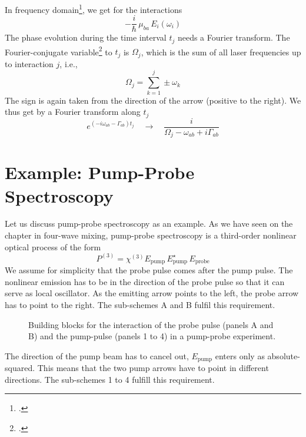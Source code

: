 In frequency domain\footcite{Boyd2008,Shen2003}, we get for the interactions
\begin{equation}
 - \frac{i}{\hbar} \, \mu_{ba} \, E_i(\omega_i)  
\end{equation}
The phase evolution during the time interval $t_j$ needs a Fourier transform. 
The Fourier-conjugate variable\footcite{Tokmakoff09} to $t_j$  is $\Omega_j$, which is the sum of all laser frequencies up to interaction $j$, i.e.,
\begin{equation}
 \Omega_j = \sum_{k=1}^j \pm \omega_k
\end{equation}
The sign is again taken from the direction of the arrow (positive to the right). We thus get
 by a Fourier transform  along $t_j$ 
\begin{equation}
 e^{ (-i \omega_{ab} - \Gamma_{ab}) t_j }  \quad \rightarrow \quad
 \frac{i }{\Omega_j - \omega_{ab}  + i \Gamma_{ab} } 
\end{equation}




\section{Example: Pump-Probe Spectroscopy}

Let us discuss pump-probe spectroscopy as an example. As we have seen on the chapter in four-wave mixing, pump-probe spectroscopy is a third-order nonlinear optical process of the form
\begin{equation}
 P^{(3)} =  \chi^{(3)} E_\text{pump} \, E_\text{pump}^\star \, E_\text{probe}
\end{equation}
We assume for simplicity that the probe pulse comes after the pump pulse. The nonlinear emission has to be in the direction of the probe pulse so that it can serve as local oscillator. As the emitting arrow points to the left, the probe arrow has to point to the right. The sub-schemes A and B fulfil this requirement.


\begin{figure}

\caption{
Building blocks for the interaction of the probe pulse (panels A and B) and the pump-pulse (panels 1 to 4) in a pump-probe experiment.}
\label{fig:2d_feynman_pp_elements}
\end{figure}

The direction of the pump beam has to cancel out, $E_\text{pump} $ enters only as absolute-squared. This means that the two pump arrows have to point in different directions. The sub-schemes 1 to 4 fulfill this requirement.

